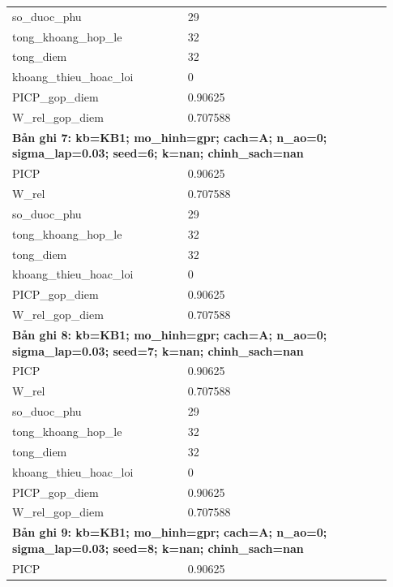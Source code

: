 \begin{longtable}{p{0.43\linewidth}p{0.50\linewidth}}
so\_\allowbreak duoc\_\allowbreak phu & 29 \\
tong\_\allowbreak khoang\_\allowbreak hop\_\allowbreak le & 32 \\
tong\_\allowbreak diem & 32 \\
khoang\_\allowbreak thieu\_\allowbreak hoac\_\allowbreak loi & 0 \\
PICP\_\allowbreak gop\_\allowbreak diem & 0.90625 \\
W\_\allowbreak rel\_\allowbreak gop\_\allowbreak diem & 0.707588 \\
\midrule
\multicolumn{2}{p{0.95\linewidth}}{\textbf{Bản ghi 7: kb=KB1; mo\_hinh=gpr; cach=A; n\_ao=0; sigma\_lap=0.03; seed=6; k=nan; chinh\_sach=nan}} \\
PICP & 0.90625 \\
W\_\allowbreak rel & 0.707588 \\
so\_\allowbreak duoc\_\allowbreak phu & 29 \\
tong\_\allowbreak khoang\_\allowbreak hop\_\allowbreak le & 32 \\
tong\_\allowbreak diem & 32 \\
khoang\_\allowbreak thieu\_\allowbreak hoac\_\allowbreak loi & 0 \\
PICP\_\allowbreak gop\_\allowbreak diem & 0.90625 \\
W\_\allowbreak rel\_\allowbreak gop\_\allowbreak diem & 0.707588 \\
\midrule
\multicolumn{2}{p{0.95\linewidth}}{\textbf{Bản ghi 8: kb=KB1; mo\_hinh=gpr; cach=A; n\_ao=0; sigma\_lap=0.03; seed=7; k=nan; chinh\_sach=nan}} \\
PICP & 0.90625 \\
W\_\allowbreak rel & 0.707588 \\
so\_\allowbreak duoc\_\allowbreak phu & 29 \\
tong\_\allowbreak khoang\_\allowbreak hop\_\allowbreak le & 32 \\
tong\_\allowbreak diem & 32 \\
khoang\_\allowbreak thieu\_\allowbreak hoac\_\allowbreak loi & 0 \\
PICP\_\allowbreak gop\_\allowbreak diem & 0.90625 \\
W\_\allowbreak rel\_\allowbreak gop\_\allowbreak diem & 0.707588 \\
\midrule
\multicolumn{2}{p{0.95\linewidth}}{\textbf{Bản ghi 9: kb=KB1; mo\_hinh=gpr; cach=A; n\_ao=0; sigma\_lap=0.03; seed=8; k=nan; chinh\_sach=nan}} \\
PICP & 0.90625 \\

\end{longtable}
